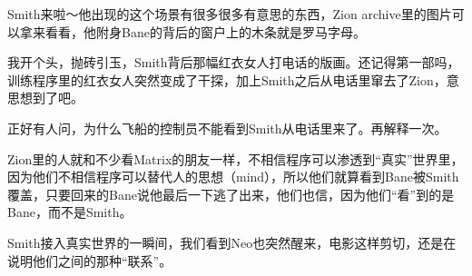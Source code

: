 \documentclass[UTF8]{ctexart}
\begin{document}
Smith来啦～他出现的这个场景有很多很多有意思的东西，Zion archive里的图片可以拿来看看，他附身Bane的背后的窗户上的木条就是罗马字母。

我开个头，抛砖引玉，Smith背后那幅红衣女人打电话的版画。还记得第一部吗，训练程序里的红衣女人突然变成了干探，加上Smith之后从电话里窜去了Zion，意思想到了吧。

正好有人问，为什么飞船的控制员不能看到Smith从电话里来了。再解释一次。

Zion里的人就和不少看Matrix的朋友一样，不相信程序可以渗透到“真实”世界里，因为他们不相信程序可以替代人的思想（mind），所以他们就算看到Bane被Smith覆盖，只要回来的Bane说他最后一下逃了出来，他们也信，因为他们“看”到的是Bane，而不是Smith。

Smith接入真实世界的一瞬间，我们看到Neo也突然醒来，电影这样剪切，还是在说明他们之间的那种“联系”。
\end{document}
